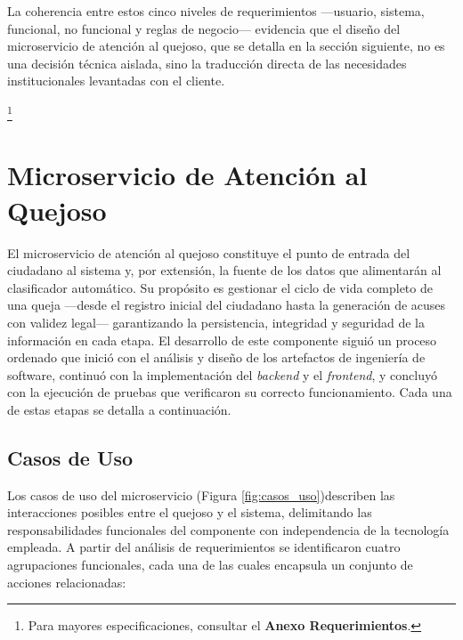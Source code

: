 La coherencia entre estos cinco niveles de requerimientos —usuario, sistema, 
funcional, no funcional y reglas de negocio— evidencia que el diseño del 
microservicio de atención al quejoso, que se detalla en la sección siguiente, 
no es una decisión técnica aislada, sino la traducción directa de las necesidades 
institucionales levantadas con el cliente.


\footnote{Para mayores especificaciones, consultar el \textbf{Anexo Requerimientos}.}


\section{Microservicio de Atención al Quejoso}
\label{sec:microservicio_quejoso}

El microservicio de atención al quejoso constituye el punto de entrada del 
ciudadano al sistema y, por extensión, la fuente de los datos que alimentarán 
al clasificador automático. Su propósito es gestionar el ciclo de vida completo 
de una queja —desde el registro inicial del ciudadano hasta la generación de 
acuses con validez legal— garantizando la persistencia, integridad y seguridad 
de la información en cada etapa. El desarrollo de este componente siguió un 
proceso ordenado que inició con el análisis y diseño de los artefactos de 
ingeniería de software, continuó con la implementación del \textit{backend} y 
el \textit{frontend}, y concluyó con la ejecución de pruebas que verificaron 
su correcto funcionamiento. Cada una de estas etapas se detalla a continuación.

\subsection{Casos de Uso}
\label{subsec:casos_uso}

Los casos de uso del microservicio (Figura \ref{fig:casos_uso})describen las interacciones posibles entre 
el quejoso y el sistema, delimitando las responsabilidades funcionales del 
componente con independencia de la tecnología empleada. A partir del análisis 
de requerimientos se identificaron cuatro agrupaciones funcionales, cada una de 
las cuales encapsula un conjunto de acciones relacionadas:

